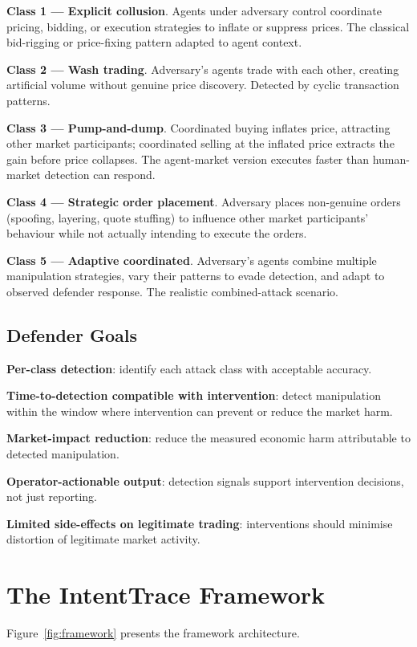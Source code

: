 \documentclass[sigconf,nonacm]{acmart}
\begin{document}
\textbf{Class 1 --- Explicit collusion}. Agents under adversary
control coordinate pricing, bidding, or execution strategies to
inflate or suppress prices. The classical bid-rigging or
price-fixing pattern adapted to agent context.

\textbf{Class 2 --- Wash trading}. Adversary's agents trade
with each other, creating artificial volume without genuine price
discovery. Detected by cyclic transaction patterns.

\textbf{Class 3 --- Pump-and-dump}. Coordinated buying inflates
price, attracting other market participants; coordinated selling at
the inflated price extracts the gain before price collapses. The
agent-market version executes faster than human-market detection
can respond.

\textbf{Class 4 --- Strategic order placement}. Adversary places
non-genuine orders (spoofing, layering, quote stuffing) to influence
other market participants' behaviour while not actually intending to
execute the orders.

\textbf{Class 5 --- Adaptive coordinated}. Adversary's agents
combine multiple manipulation strategies, vary their patterns
to evade detection, and adapt to observed defender response. The
realistic combined-attack scenario.

\subsection{Defender Goals}

\textbf{Per-class detection}: identify each attack class with
acceptable accuracy.

\textbf{Time-to-detection compatible with intervention}: detect
manipulation within the window where intervention can prevent or
reduce the market harm.

\textbf{Market-impact reduction}: reduce the measured economic
harm attributable to detected manipulation.

\textbf{Operator-actionable output}: detection signals support
intervention decisions, not just reporting.

\textbf{Limited side-effects on legitimate trading}: interventions
should minimise distortion of legitimate market activity.

\section{The IntentTrace Framework}

Figure~\ref{fig:framework} presents the framework architecture.
\end{document}
